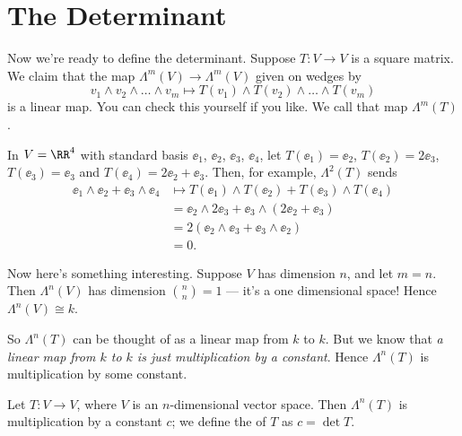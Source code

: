 \section{The Determinant}
Now we're ready to define the determinant.
Suppose $T : V \to V$ is a square matrix.
We claim that the map $\Lambda^m(V) \to \Lambda^m(V)$ given on wedges by
\[ v_1 \wedge v_2 \wedge \dots \wedge v_m
	\mapsto T(v_1) \wedge T(v_2) \wedge \dots \wedge T(v_m) \]
is a linear map.
You can check this yourself if you like.
We call that map $\Lambda^m(T)$.
\begin{example}
	In $V = \RR^4$ with standard basis $\ee_1$, $\ee_2$, $\ee_3$, $\ee_4$,
	let $T(\ee_1) = \ee_2$, $T(\ee_2) = 2\ee_3$, $T(\ee_3) = \ee_3$ and $T(\ee_4) = 2\ee_2 + \ee_3$.
	Then, for example, $\Lambda^2(T)$ sends
	\begin{align*}
		\ee_1 \wedge \ee_2 + \ee_3 \wedge \ee_4
		&\mapsto T(\ee_1) \wedge T(\ee_2) + T(\ee_3) \wedge T(\ee_4) \\
		&= \ee_2 \wedge 2\ee_3 + \ee_3 \wedge (2\ee_2 + \ee_3) \\
		&= 2(\ee_2 \wedge \ee_3 + \ee_3\wedge \ee_2) \\
		&= 0.
	\end{align*}
\end{example}

Now here's something interesting.
Suppose $V$ has dimension $n$, and let $m=n$.
Then $\Lambda^n(V)$ has dimension $\binom nn = 1$ --- it's a one dimensional space!
Hence $\Lambda^n(V) \cong k$.

So $\Lambda^n(T)$ can be thought of as a linear map from $k$ to $k$.
But we know that \emph{a linear map from $k$ to $k$ is just multiplication by a constant}.
Hence $\Lambda^n(T)$ is multiplication by some constant.
\begin{definition}
	Let $T : V \to V$, where $V$ is an $n$-dimensional vector space.
	Then $\Lambda^n(T)$ is multiplication by a constant $c$;
	we define the  of $T$ as $c = \det T$.
\end{definition}

